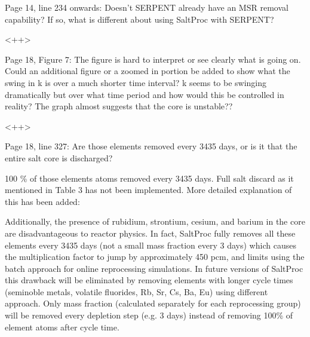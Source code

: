 \documentclass[answers,11pt]{exam}
\begin{document}
\begin{questions}
        \question  Page 14, line 234 onwards: Doesn't SERPENT already have an 
        MSR removal capability? If so, what is different about using SaltProc 
        with SERPENT?
        \begin{solution}
                <++>
        \end{solution}

        \question  Page 18, Figure 7: The figure is hard to interpret or see 
        clearly what is going on. Could an additional figure or a zoomed in 
        portion be added to show what the swing in k is over a much shorter 
        time interval? k seems to be swinging dramatically but over what time 
        period and how would this be controlled in reality? The graph almost 
        suggests that the core is unstable??
        \begin{solution}
                <++>
        \end{solution}

        \question  Page 18, line 327: Are those elements removed every 3435 
        days, or is it that the entire salt core is discharged?
        \begin{solution}
		        100 \% of those elements atoms removed every 3435 days. Full salt discard
		         as it mentioned in Table 3 has not been implemented. More detailed 
		         explanation of this has been added:
        
		        Additionally, the presence of rubidium, strontium, cesium, and barium in
		         the core are disadvantageous to reactor physics. In fact, SaltProc fully 
		         removes all these elements every 3435 days (not a small mass fraction 
		         every 3 days) which causes the multiplication factor to jump by 
		        approximately 450 pcm, and limits using the batch approach for online 
		        reprocessing simulations. In future versions of SaltProc this drawback 
		        will be eliminated by removing elements with longer cycle times (seminoble 
		        metals, volatile fluorides, Rb, Sr, Cs, Ba, Eu) using different approach. 
		        Only mass fraction (calculated separately for each reprocessing group) 
		        will be removed every depletion step (e.g. 3 days) instead of removing 
		        100\% of element atoms after cycle time. 
        \end{solution}


\end{questions}
\end{document}
